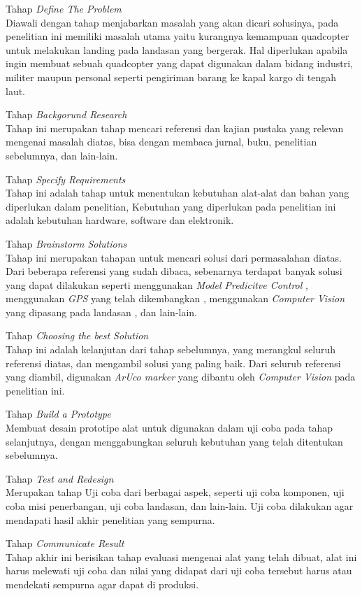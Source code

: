 \begin{packed_enum}
	\item Tahap \textit{Define The Problem}
\\Diawali dengan tahap menjabarkan masalah yang akan dicari solusinya, pada penelitian ini memiliki masalah utama yaitu kurangnya kemampuan quadcopter untuk melakukan landing pada landasan yang bergerak. Hal diperlukan apabila ingin membuat sebuah quadcopter yang dapat digunakan dalam bidang industri, militer maupun personal seperti pengiriman barang ke kapal kargo di tengah laut.
	\item Tahap \textit{Backgorund Research}
\\Tahap ini merupakan tahap mencari referensi dan kajian pustaka yang relevan mengenai masalah diatas, bisa dengan membaca jurnal, buku, penelitian sebelumnya, dan lain-lain.
	\item Tahap \textit{Specify Requirements}
\\Tahap ini adalah tahap untuk menentukan kebutuhan alat-alat dan bahan yang diperlukan dalam penelitian, Kebutuhan yang diperlukan pada penelitian ini adalah kebutuhan hardware, software dan elektronik.
	\item Tahap \textit{Brainstorm Solutions}
\\Tahap ini merupakan tahapan untuk mencari solusi dari permasalahan diatas. Dari beberapa referensi yang sudah dibaca, sebenarnya terdapat banyak solusi yang dapat dilakukan seperti menggunakan \textit{Model Predicitve Control} \citep{guo2022autonomous}, menggunakan \textit{GPS} yang telah dikembangkan \citep{khyasudeen2022development}, menggunakan \textit{Computer Vision} yang dipasang pada landasan \citep{goh2019outdoor}, dan lain-lain.
	\item Tahap \textit{Choosing the best Solution}
\\ Tahap ini adalah kelanjutan dari tahap sebelumnya, yang merangkul seluruh referensi diatas, dan mengambil solusi yang paling baik. Dari selurub referensi yang diambil, digunakan \textit{ArUco marker} yang dibantu oleh \textit{Computer Vision} pada penelitian ini.
	\item Tahap \textit{Build a Prototype}
\\ Membuat desain prototipe alat untuk digunakan dalam uji coba pada tahap selanjutnya, dengan menggabungkan seluruh kebutuhan yang telah ditentukan sebelumnya.
	\item Tahap \textit{Test and Redesign}
\\ Merupakan tahap Uji coba dari berbagai aspek, seperti uji coba komponen, uji coba misi penerbangan, uji coba landasan, dan lain-lain. Uji coba dilakukan agar mendapati hasil akhir penelitian yang sempurna.
	\item Tahap \textit{Communicate Result}
\\Tahap akhir ini berisikan tahap evaluasi mengenai alat yang telah dibuat, alat ini harus melewati uji coba dan nilai yang didapat dari uji coba tersebut harus atau mendekati sempurna agar dapat di produksi.
\end{packed_enum}

